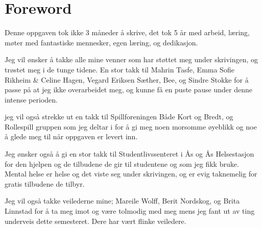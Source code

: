 \section*{Foreword}

Denne oppgaven tok ikke 3 måneder å skrive, det tok 5 år med arbeid, læring, møter med fantastiske mennesker, egen læring, og dedikasjon.

Jeg vil ønsker å takke alle mine venner som har støttet meg under skrivingen, og trøstet meg i de tunge tidene. En stor takk til Mahrin Tasfe, Emma Sofie Rikheim \& Celine Hagen, Vegard Eriksen Sæther, Bee, og Sindre Stokke for å passe på at jeg ikke overarbeidet meg, og kunne få en puste pause under denne intense perioden.

jeg vil også strekke ut en takk til Spillforeningen Både Kort og Bredt, og Rollespill gruppen som jeg deltar i for å gi meg noen morsomme øyeblikk og noe å glede meg til når oppgaven er levert inn.

Jeg ønsker også å gi en stor takk til Studentlivssenteret i Ås og Ås Helsestasjon for den hjelpen og de tilbudene de gir til studentene og som jeg fikk bruke. Mental helse er helse og det viste seg under skrivingen, og er evig taknemelig for gratis tilbudene de tilbyr.

Jeg vil også takke veilederne mine; Mareile Wolff, Berit Nordskog, og Brita Linnstad for å ta meg imot og være tolmodig med meg mens jeg fant ut av ting underveis dette semesteret. Dere har vært flinke veiledere.
